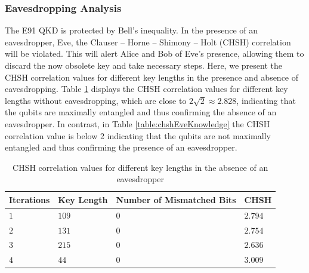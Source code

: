\documentclass[a4paper]{cas-sc}
\begin{document}
\subsubsection{Eavesdropping Analysis}
The E91 QKD is protected by Bell's inequality. In the presence of an eavesdropper, Eve, the Clauser -- Horne -- Shimony -- Holt (CHSH) correlation \cite{PhysRevLett.23.880} will be violated. This will alert Alice and Bob of Eve's presence, allowing them to discard the now obsolete key and take necessary steps. Here, we present the CHSH correlation values for different key lengths in the presence and absence of eavesdropping. Table \ref{table:chsheRsults} displays the CHSH correlation values for different key lengths without eavesdropping, which are close to $2\sqrt{2} \approx 2.828$, indicating that the qubits are maximally entangled and thus confirming the absence of an eavesdropper. In contrast, in Table \ref{table:chshEveKnowledge} the CHSH correlation value is below 2 indicating that the qubits are not maximally entangled and thus confirming the presence of an eavesdropper.
\begin{table}[pos=h]
    \begin{center}
        \caption{CHSH correlation values for different key lengths in the absence of an eavesdropper}
        \begin{tabularx}{\textwidth}{>{\centering\arraybackslash}X>{\centering\arraybackslash}X>{\centering\arraybackslash}X>{\centering\arraybackslash}X}
            \hline
            Iterations & Key Length & Number of Mismatched Bits & CHSH    \\ \hline
            $1$        & $109$      & $0$                       & $2.794$ \\
            $2$        & $131$      & $0$                       & $2.754$ \\
            $3$        & $215$      & $0$                       & $2.636$ \\
            $4$        & $44$       & $0$                       & $3.009$ \\
            \hline
        \end{tabularx}
        \label{table:chsheRsults}
    \end{center}
\end{table}
\end{document}
